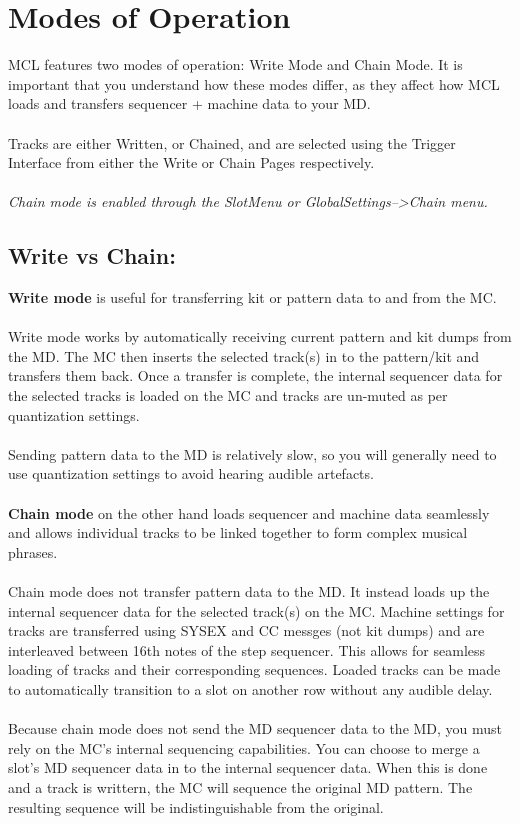 \chapter{Modes of Operation}
MCL features two modes of operation: Write Mode and Chain Mode. It is important that you understand how these modes differ, as they affect how MCL loads and transfers sequencer + machine data to your MD.\\
\\
Tracks are either Written, or Chained, and are selected using the Trigger Interface from either the Write or Chain Pages respectively. \\
\\
\textit{Chain mode is enabled through the SlotMenu or GlobalSettings-->Chain menu.}
\section{Write vs Chain:}
\textbf{Write mode} is useful for transferring kit or pattern data to and from the MC. \\
\\
Write mode works by automatically receiving current pattern and kit dumps from the MD. The MC then inserts the selected track(s) in to the pattern/kit and transfers them back. Once a transfer is complete, the internal sequencer data for the selected tracks is loaded on the MC and tracks are un-muted as per quantization settings.\\
\\
Sending pattern data to the MD is relatively slow, so you will generally need to use quantization settings to avoid hearing audible artefacts.\\
\\
\textbf{Chain mode} on the other hand loads sequencer and machine data seamlessly and allows individual tracks to be linked together to form complex musical phrases. \\
\\
Chain mode does not transfer pattern data to the MD. It instead  loads up the internal sequencer data for the selected track(s) on the MC. Machine settings for tracks are transferred using SYSEX and CC messges (not kit dumps) and are interleaved between 16th notes of the step sequencer. This allows for seamless loading of tracks and their corresponding sequences. Loaded tracks can be made to automatically transition to a slot on another row without any audible delay. \\
\\
Because chain mode does not send the MD sequencer data to the MD, you must rely on the MC's internal sequencing capabilities. You can choose to merge a slot's MD sequencer data in to the internal sequencer data. When this is done and a track is writtern, the MC will sequence the original MD pattern. The resulting sequence will be indistinguishable from the original.

